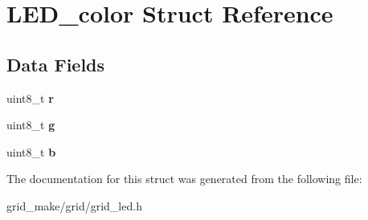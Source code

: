 \hypertarget{structLED__color}{\section{L\-E\-D\-\_\-color Struct Reference}
\label{structLED__color}
}
\subsection*{Data Fields}
\begin{DoxyCompactItemize}
\item 
\hypertarget{structLED__color_af6b213bb110fb64f4ca0617a74f69d4f}{uint8\-\_\-t {\bfseries r}}\label{structLED__color_af6b213bb110fb64f4ca0617a74f69d4f}

\item 
\hypertarget{structLED__color_a97c0f0f21d8db948123acdd379392a63}{uint8\-\_\-t {\bfseries g}}\label{structLED__color_a97c0f0f21d8db948123acdd379392a63}

\item 
\hypertarget{structLED__color_a52f9337e2e07c5a1c374262efdcf9481}{uint8\-\_\-t {\bfseries b}}\label{structLED__color_a52f9337e2e07c5a1c374262efdcf9481}

\end{DoxyCompactItemize}


The documentation for this struct was generated from the following file\-:\begin{DoxyCompactItemize}
\item 
grid\-\_\-make/grid/grid\-\_\-led.\-h\end{DoxyCompactItemize}
